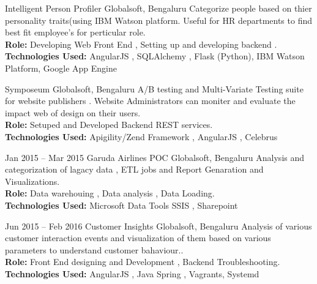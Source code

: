 \documentclass[]{friggeri-cv} %
\begin{document}
\begin{entrylist}
{Intelligent Person Profiler}
{Globalsoft, Bengaluru}
{Categorize people based on thier personality traits(using IBM Watson platform. Useful for HR departments to find best fit employee's for perticular role.\\
\textbf{Role:} Developing Web Front End  , Setting up and developing backend .\\
\textbf{Technologies Used:} AngularJS , SQLAlchemy , Flask (Python), IBM Watson Platform, Google App Engine}
\end{entrylist}

\begin{entrylist}
{Symposeum}
{Globalsoft, Bengaluru}
{A/B testing and Multi-Variate Testing suite for website publishers . Website Administrators can moniter and evaluate the impact web of design on their users.\\
\textbf{Role:} Setuped and Developed Backend REST services.\\
\textbf{Technologies Used:} Apigility/Zend Framework , AngularJS , Celebrus}
\end{entrylist}

{}

\begin{entrylist}
\entry
{Jan 2015 -- Mar 2015}
{Garuda Airlines POC}
{Globalsoft, Bengaluru}
{Analysis and categorization of lagacy data , ETL jobs and Report Genaration and Visualizations.\\
\textbf{Role:} Data warehouing , Data analysis , Data Loading.\\
\textbf{Technologies Used:} Microsoft Data Tools SSIS , Sharepoint}
\end{entrylist}

\begin{entrylist}
\entry
{Jun 2015 -- Feb 2016}
{Customer Insights}
{Globalsoft, Bengaluru}
{Analysis of various customer interaction events and visualization of them based on various parameters to understand customer bahaviour..\\
\textbf{Role:} Front End designing and Development , Backend Troubleshooting.\\
\textbf{Technologies Used:} AngularJS , Java Spring , Vagrants, Systemd}
\end{entrylist}
\end{document}
